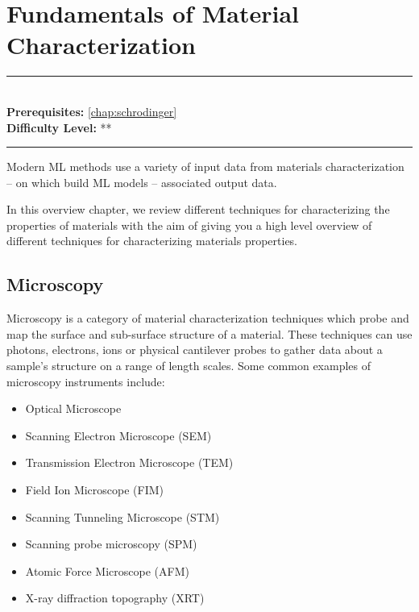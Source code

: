 \documentclass[book.tex]{subfiles}
\begin{document}
\chapter{Fundamentals of Material Characterization}

\label{chap:fund_matchar}
\noindent\rule{11cm}{0.4pt} \\
\textbf{Prerequisites:}  \autoref{chap:schrodinger} \\
\textbf{Difficulty Level:} ** \\
\noindent\rule{11cm}{0.4pt}
\vspace{5mm}


Modern ML methods use a variety of input data from materials characterization -- on which build ML models -- associated output data.

In this overview chapter, we review different techniques for characterizing the properties of materials with the aim of giving you a high level overview of different techniques for characterizing materials properties.
 
\section{Microscopy}

Microscopy is a category of material characterization techniques which probe and map the surface and sub-surface structure of a material. These techniques can use photons, electrons, ions or physical cantilever probes to gather data about a sample's structure on a range of length scales. Some common examples of microscopy instruments include:
\begin{itemize}
\item Optical Microscope
\item Scanning Electron Microscope (SEM)
\item Transmission Electron Microscope (TEM)
\item Field Ion Microscope (FIM)
\item Scanning Tunneling Microscope (STM)
\item Scanning probe microscopy (SPM)
\item Atomic Force Microscope (AFM)
\item X-ray diffraction topography (XRT)
\end{itemize}
\end{document}
